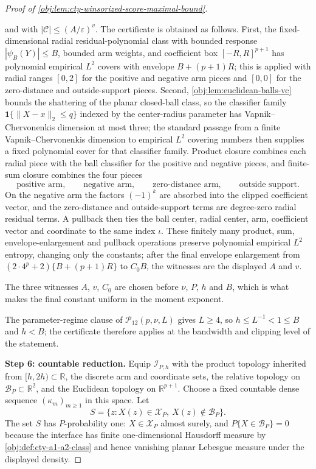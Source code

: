 \begin{proof}[Proof of \cref{obj:lem:cty-winsorized-score-maximal-bound}]
\begin{itemize}
and with \(|\mathcal C|\leq(A/\varepsilon)^v\).  The certificate is obtained as follows.  First, the fixed-dimensional radial residual-polynomial class with bounded response \(|\psi_B(Y)|\leq B\), bounded arm weights, and coefficient box \([-R,R]^{p+1}\) has polynomial empirical \(L^2\) covers with envelope \(B+(p+1)R\); this is applied with radial ranges \([0,2]\) for the positive and negative arm pieces and \([0,0]\) for the zero-distance and outside-support pieces.  Second, \cref{obj:lem:euclidean-balls-vc} bounds the shattering of the planar closed-ball class, so the classifier family \(\mathbf 1\{\lVert X-x\rVert_2\leq q\}\) indexed by the center-radius parameter has Vapnik--Chervonenkis dimension at most three; the standard passage from a finite Vapnik--Chervonenkis dimension to empirical \(L^2\) covering numbers \citep{Pollard1984,VanderVaart1996} then supplies a fixed polynomial cover for that classifier family.  Product closure combines each radial piece with the ball classifier for the positive and negative pieces, and finite-sum closure combines the four pieces
\[
\text{positive arm},\qquad
\text{negative arm},\qquad
\text{zero-distance arm},\qquad
\text{outside support}.
\]
On the negative arm the factors \((-1)^k\) are absorbed into the clipped coefficient vector, and the zero-distance and outside-support terms are degree-zero radial residual terms.  A pullback then ties the ball center, radial center, arm, coefficient vector and coordinate to the same index \(\iota\).  These finitely many product, sum, envelope-enlargement and pullback operations preserve polynomial empirical \(L^2\) entropy, changing only the constants; after the final envelope enlargement from \((2\cdot4^p+2)\{B+(p+1)R\}\) to \(C_0B\), the witnesses are the displayed \(A\) and \(v\).
\end{itemize}
The three witnesses \(A\), \(v\), \(C_0\) are chosen before \(\nu\), \(P\), \(h\) and \(B\), which is what makes the final constant uniform in the moment exponent.

The parameter-regime clause of \(\mathcal P_{12}(p,\nu,L)\) gives \(L\geq4\), so \(h\leq L^{-1}<1\leq B\) and \(h<B\); the certificate therefore applies at the bandwidth and clipping level of the statement.

\textbf{Step 6: countable reduction.}  Equip \(\mathcal I_{P,h}\) with the product topology inherited from \([h,2h)\subset\mathbb R\), the discrete arm and coordinate sets, the relative topology on \(\mathcal B_P\subset\mathbb R^2\), and the Euclidean topology on \(\mathbb R^{p+1}\).  Choose a fixed countable dense sequence \((\kappa_m)_{m\geq1}\) in this space.  Let
\[
S=\{z:X(z)\in\mathcal X_P,\ X(z)\notin\mathcal B_P\}.
\]
The set \(S\) has \(P\)-probability one: \(X\in\mathcal X_P\) almost surely, and \(P\{X\in\mathcal B_P\}=0\) because the interface has finite one-dimensional Hausdorff measure by \cref{obj:def:cty-a1-a2-class} and hence vanishing planar Lebesgue measure under the displayed density.


\end{proof}
